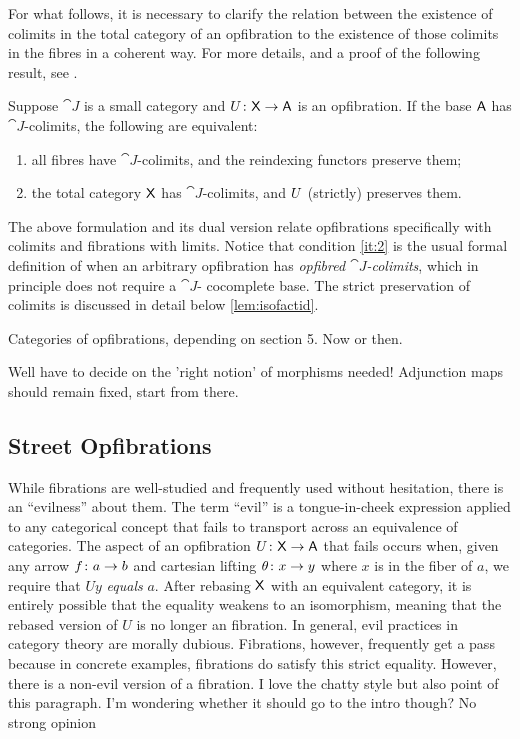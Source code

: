 \documentclass{amsart}
\begin{document}
For what follows, it is necessary to clarify the relation between the existence of colimits in the total category of an opfibration to the existence of those colimits in the fibres in a coherent way. For more details, and a proof of the following result, see \cite[Cor. 3.7]{FibredAdjunctions}.

\begin{lem}\label{lem:fibrewiselimits}
Suppose $\cat{J}$ is a small category and $U\colon\mathsf{X}\to\mathsf{A}$ is an opfibration. If the base $\mathsf{A}$ has $\cat{J}$-colimits,
the following are equivalent:
\begin{enumerate}
 \item all fibres have $\cat{J}$-colimits, and the reindexing functors preserve them; \label{it:2}
 \item the total category $\mathsf{X}$ has $\cat{J}$-colimits, and $U$ (strictly) preserves them.
\end{enumerate}
\end{lem}
The above formulation and its dual version relate opfibrations specifically with colimits and fibrations with limits. Notice that condition \ref{it:2} is the usual formal definition of when an arbitrary opfibration has \emph{opfibred $\cat{J}$-colimits}, which in principle does not require a $\cat{J}$-
cocomplete base. The strict preservation of colimits is discussed in detail below \cref{lem:isofactid}.

{\chris Categories of opfibrations, depending on section 5. Now or then.}

{\chris Well have to decide on the 'right notion' of morphisms needed! Adjunction maps should remain fixed, start from there.}

\subsection*{Street Opfibrations}

While fibrations are well-studied and frequently used
without hesitation, there is an ``evilness'' about them. The
term ``evil'' is a tongue-in-cheek expression applied to any
categorical concept that fails to transport across an
equivalence of categories.  The aspect of an opfibration
$ U \colon \mathsf{X} \to \mathsf{A} $ that fails occurs when, given any arrow
$ f \colon a \to b $ and cartesian lifting
$ \theta \colon x \to y $ where $ x $ is in the fiber of
$ a $, we require that $ Uy $ \emph{equals} $ a $.  After
rebasing $ \mathsf{X} $ with an equivalent category, it is entirely
possible that the equality weakens to an isomorphism, meaning
that the rebased version of $ U $ is no longer an
fibration. In general, evil practices in category theory are
morally dubious. Fibrations, however, frequently get a pass
because in concrete examples, fibrations do satisfy this
strict equality.  However, there is a non-evil version of a
fibration. {\chris I love the chatty style but also point of this paragraph. I'm wondering whether it should go to the intro though? No strong opinion}
\end{document}
